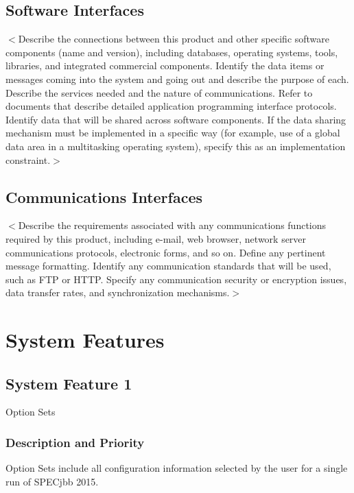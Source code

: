 \documentclass{scrreprt}
\begin{document}
\section{Software Interfaces}
$<$Describe the connections between this product and other specific software 
components (name and version), including databases, operating systems, tools, 
libraries, and integrated commercial components. Identify the data items or 
messages coming into the system and going out and describe the purpose of each.  
Describe the services needed and the nature of communications. Refer to 
documents that describe detailed application programming interface protocols.  
Identify data that will be shared across software components. If the data 
sharing mechanism must be implemented in a specific way (for example, use of a 
global data area in a multitasking operating system), specify this as an 
implementation constraint.$>$

\section{Communications Interfaces}
$<$Describe the requirements associated with any communications functions 
required by this product, including e-mail, web browser, network server 
communications protocols, electronic forms, and so on. Define any pertinent 
message formatting. Identify any communication standards that will be used, such 
as FTP or HTTP. Specify any communication security or encryption issues, data 
transfer rates, and synchronization mechanisms.$>$


\chapter{System Features}

\section{System Feature 1}
Option Sets

\subsection{Description and Priority}
Option Sets include all configuration information selected by the user for a single run of SPECjbb 2015.
\end{document}
